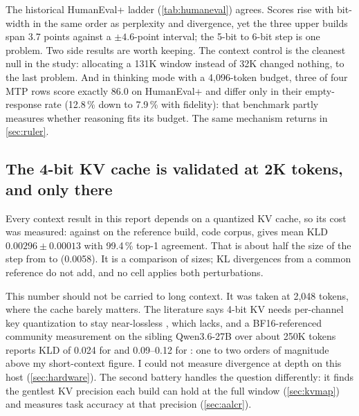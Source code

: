 The historical HumanEval+ ladder (\cref{tab:humaneval}) agrees. Scores rise with bit-width in the same
order as perplexity and divergence, yet the three upper builds span 3.7 points against a $\pm4.6$-point
interval; the 5-bit to 6-bit step is one problem. Two side results are worth keeping. The context
control is the cleanest null in the study: allocating a 131K window instead of 32K changed nothing, to
the last problem. And in thinking mode with a 4{,}096-token budget, three of four MTP rows score exactly
86.0 on HumanEval+ and differ only in their empty-response rate (12.8\,\% down to 7.9\,\% with
fidelity): that benchmark partly measures whether reasoning fits its budget. The same mechanism
returns in \cref{sec:ruler}.

\subsection{The 4-bit KV cache is validated at 2K tokens, and only there}\label{sec:kvq}
Every context result in this report depends on a quantized KV cache, so its cost was measured:
 against  on the reference build, code corpus, gives mean KLD
$0.00296\pm0.00013$ with 99.4\,\% top-1 agreement. That is about half the size of the step from
\QsixXL{} to \Qsix{} (0.0058). It is a comparison of sizes; KL divergences from a common reference do
not add, and no cell applies both perturbations.

This number should not be carried to long context. It was taken at 2{,}048 tokens, where the cache
barely matters. The literature says 4-bit KV needs per-channel key quantization to stay near-lossless
\citep{liu2024kivi,hooper2024kvquant}, which  lacks, and a BF16-referenced community
measurement on the sibling Qwen3.6-27B over about 250K tokens reports KLD of 0.024 for  and
0.09--0.12 for  \citep{localbench2026kvquant}: one to two orders of magnitude above my
short-context figure. I could not measure divergence at depth on this host (\cref{sec:hardware}). The
second battery handles the question differently: it finds the gentlest KV precision each build can
hold at the full window (\cref{sec:kvmap}) and measures task accuracy at that precision
(\cref{sec:aalcr}).

